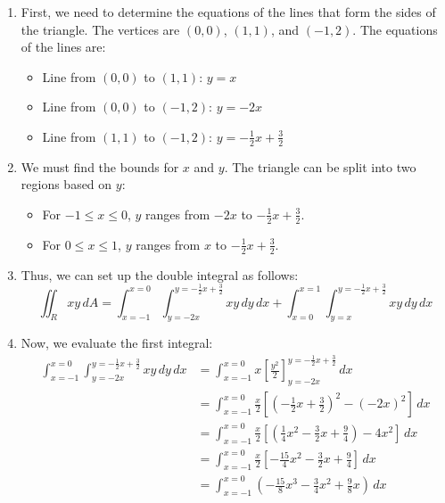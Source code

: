 \documentclass[reqno, 12pt]{amsart}
\begin{document}
\begin{itemize}
    \begin{answerbox}
      \begin{enumerate}
        \item First, we need to determine the equations of the lines that form the sides of the triangle. The vertices are $(0,0)$, $(1,1)$, and $(-1,2)$. The equations of the lines are:
          \begin{itemize}
            \item Line from $(0,0)$ to $(1,1)$: $y = x$
            \item Line from $(0,0)$ to $(-1,2)$: $y = -2x$
            \item Line from $(1,1)$ to $(-1,2)$: $y = -\frac{1}{2}x + \frac{3}{2}$
          \end{itemize}
        \item We must find the bounds for $x$ and $y$. The triangle can be split into two regions based on $y$:
          \begin{itemize}
            \item For $-1 \leq x \leq 0$, $y$ ranges from $-2x$ to $-\frac{1}{2}x + \frac{3}{2}$.
            \item For $0 \leq x \leq 1$, $y$ ranges from $x$ to $-\frac{1}{2}x + \frac{3}{2}$.
          \end{itemize}
        \item Thus, we can set up the double integral as follows:
          \[\iint_R xy \, dA = \int_{x=-1}^{x=0} \int_{y=-2x}^{y=-\frac{1}{2}x + \frac{3}{2}} xy \, dy \, dx + \int_{x=0}^{x=1} \int_{y=x}^{y=-\frac{1}{2}x + \frac{3}{2}} xy \, dy \, dx\]
        \item Now, we evaluate the first integral:
          \begin{align*}
            \int_{x=-1}^{x=0} \int_{y=-2x}^{y=-\frac{1}{2}x + \frac{3}{2}} xy \, dy \, dx &= \int_{x=-1}^{x=0} x \left[ \frac{y^2}{2} \right]_{y=-2x}^{y=-\frac{1}{2}x + \frac{3}{2}} \, dx \\
            &= \int_{x=-1}^{x=0} \frac{x}{2} \left[ \left(-\frac{1}{2}x + \frac{3}{2}\right)^2 - (-2x)^2 \right] \, dx \\
            &= \int_{x=-1}^{x=0} \frac{x}{2} \left[ \left(\frac{1}{4}x^2 - \frac{3}{2}x + \frac{9}{4}\right) - 4x^2 \right] \, dx \\
            &= \int_{x=-1}^{x=0} \frac{x}{2} \left[ -\frac{15}{4}x^2 - \frac{3}{2}x + \frac{9}{4} \right] \, dx \\
            &= \int_{x=-1}^{x=0} \left( -\frac{15}{8}x^3 - \frac{3}{4}x^2 + \frac{9}{8}x \right) \, dx \\

\end{align*}
\end{enumerate}
\end{answerbox}
\end{itemize}
\end{document}
